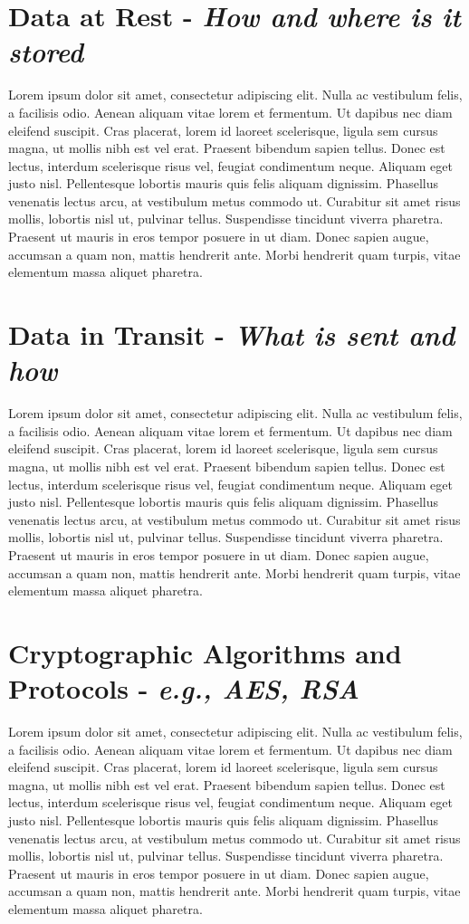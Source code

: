 \documentclass[9pt]{extarticle}
\begin{document}
\section{Data at Rest - \textit{How and where is it stored}}
Lorem ipsum dolor sit amet, consectetur adipiscing elit. Nulla ac vestibulum felis, a facilisis odio. Aenean aliquam vitae lorem et fermentum. Ut dapibus nec diam eleifend suscipit. Cras placerat, lorem id laoreet scelerisque, ligula sem cursus magna, ut mollis nibh est vel erat. Praesent bibendum sapien tellus. Donec est lectus, interdum scelerisque risus vel, feugiat condimentum neque. Aliquam eget justo nisl. Pellentesque lobortis mauris quis felis aliquam dignissim. Phasellus venenatis lectus arcu, at vestibulum metus commodo ut. Curabitur sit amet risus mollis, lobortis nisl ut, pulvinar tellus. Suspendisse tincidunt viverra pharetra. Praesent ut mauris in eros tempor posuere in ut diam. Donec sapien augue, accumsan a quam non, mattis hendrerit ante. Morbi hendrerit quam turpis, vitae elementum massa aliquet pharetra. 

\section{Data in Transit - \textit{What is sent and how}}
Lorem ipsum dolor sit amet, consectetur adipiscing elit. Nulla ac vestibulum felis, a facilisis odio. Aenean aliquam vitae lorem et fermentum. Ut dapibus nec diam eleifend suscipit. Cras placerat, lorem id laoreet scelerisque, ligula sem cursus magna, ut mollis nibh est vel erat. Praesent bibendum sapien tellus. Donec est lectus, interdum scelerisque risus vel, feugiat condimentum neque. Aliquam eget justo nisl. Pellentesque lobortis mauris quis felis aliquam dignissim. Phasellus venenatis lectus arcu, at vestibulum metus commodo ut. Curabitur sit amet risus mollis, lobortis nisl ut, pulvinar tellus. Suspendisse tincidunt viverra pharetra. Praesent ut mauris in eros tempor posuere in ut diam. Donec sapien augue, accumsan a quam non, mattis hendrerit ante. Morbi hendrerit quam turpis, vitae elementum massa aliquet pharetra. 

\section{Cryptographic Algorithms and Protocols - \textit{e.g., AES, RSA}}
Lorem ipsum dolor sit amet, consectetur adipiscing elit. Nulla ac vestibulum felis, a facilisis odio. Aenean aliquam vitae lorem et fermentum. Ut dapibus nec diam eleifend suscipit. Cras placerat, lorem id laoreet scelerisque, ligula sem cursus magna, ut mollis nibh est vel erat. Praesent bibendum sapien tellus. Donec est lectus, interdum scelerisque risus vel, feugiat condimentum neque. Aliquam eget justo nisl. Pellentesque lobortis mauris quis felis aliquam dignissim. Phasellus venenatis lectus arcu, at vestibulum metus commodo ut. Curabitur sit amet risus mollis, lobortis nisl ut, pulvinar tellus. Suspendisse tincidunt viverra pharetra. Praesent ut mauris in eros tempor posuere in ut diam. Donec sapien augue, accumsan a quam non, mattis hendrerit ante. Morbi hendrerit quam turpis, vitae elementum massa aliquet pharetra. 
\end{document}
